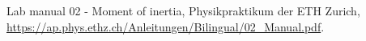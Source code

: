 
\begin{thebibliography}{99}


Lab manual 02 - Moment of inertia, Physikpraktikum der ETH Zurich,  \url{https://ap.phys.ethz.ch/Anleitungen/Bilingual/02_Manual.pdf}.




\end{thebibliography}
